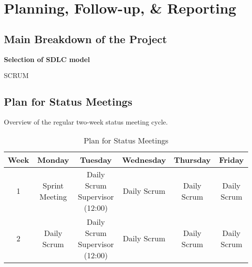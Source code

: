 \section{Planning, Follow-up, \& Reporting}
\subsection{Main Breakdown of the Project}

\textbf{Selection of SDLC model}
\begin{comment}
    Describe how the group will follow the chosen model
    
    Fire viktige forhold å ta hensyn til ved valg av utviklingmodell /
    prosessrammeverk :
    ▪ Universitetets krav til prosjektarbeidet/bacheloroppgaven
    ▪ Karakteristika ved oppgaven
    ▪ Motivasjonen og ferdighetene til deltagerne
    ▪ Ønsker og krav fra oppdragsgiver
    Velg modell – deretter bør dere tilpasse den / sette den opp til deres
    “setting”.

\end{comment}

SCRUM \cite{scrum_guide}

\subsection{Plan for Status Meetings}
Overview of the regular two-week status meeting cycle.
\begin{table}[H]
    \centering
    \begin{tabular}{|c|c|c|c|c|c|}
    \hline
    Week & Monday & Tuesday & Wednesday & Thursday & Friday \\
    \hline
    1 & Sprint Meeting & \makecell{Daily Scrum \\ Supervisor (12:00)} & Daily Scrum & Daily 
    Scrum & Daily Scrum \\
    \hline
    2 & Daily Scrum & \makecell{Daily Scrum \\ Supervisor (12:00)} & Daily Scrum & Daily 
    Scrum & Daily Scrum \\
    \hline
    \end{tabular}
    \caption{Plan for Status Meetings}
    \label{tab:meeting_plan}
\end{table}
